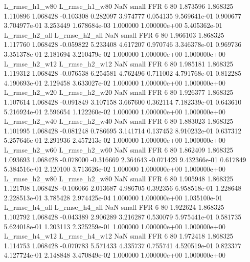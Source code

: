 L_rmse_h1_w80  L_rmse_h1_w80                   NaN      small      FFR                 6 80 1.873596       1.868325 1.110896       1.068428   -0.103308      0.282097      3.974777     0.054135   9.569641e-01  0.900677 3.704977e-01     3.253449   1.678684e-03            1.000000    1.000000e+00        5.405362e-01
 L_rmse_h2_all  L_rmse_h2_all                   NaN      small      FFR                 6 80 1.966103       1.868325 1.117760       1.068428   -0.059822      5.233408      4.617207     0.970746   3.346378e-01  0.969736 3.351378e-01     2.181694   3.210479e-02            1.000000    1.000000e+00        1.000000e+00
 L_rmse_h2_w12  L_rmse_h2_w12                   NaN      small      FFR                 6 80 1.985181       1.868325 1.119312       1.068428   -0.076538      6.254581      4.762496     0.711002   4.791768e-01  0.812285 4.190693e-01     2.129458   3.633027e-02            1.000000    1.000000e+00        1.000000e+00
 L_rmse_h2_w20  L_rmse_h2_w20                   NaN      small      FFR                 6 80 1.926377       1.868325 1.107614       1.068428   -0.091849      3.107158      3.667600     0.362114   7.182339e-01  0.643610 5.216924e-01     2.596654   1.122260e-02            1.000000    1.000000e+00        1.000000e+00
 L_rmse_h2_w40  L_rmse_h2_w40                   NaN      small      FFR                 6 80 1.883023       1.868325 1.101995       1.068428   -0.081248      0.786695      3.141714     0.137452   8.910232e-01  0.637312 5.257646e-01     2.291936   2.457213e-02            1.000000    1.000000e+00        1.000000e+00
 L_rmse_h2_w60  L_rmse_h2_w60                   NaN      small      FFR                 6 80 1.862409       1.868325 1.093693       1.068428   -0.078000     -0.316669      2.364643    -0.071429   9.432366e-01  0.617849 5.384516e-01     2.120100   3.713626e-02            1.000000    1.000000e+00        1.000000e+00
 L_rmse_h2_w80  L_rmse_h2_w80                   NaN      small      FFR                 6 80 1.905948       1.868325 1.121708       1.068428   -0.106066      2.013687      4.986705     0.392356   6.958518e-01  1.228648 2.228513e-01     3.785428   2.974425e-04            1.000000    1.000000e+00        1.035100e-01
 L_rmse_h4_all  L_rmse_h4_all                   NaN      small      FFR                 6 80 1.922624       1.868325 1.102792       1.068428   -0.043389      2.906289      3.216287     0.530079   5.975441e-01  0.581735 5.624018e-01     1.203113   2.325259e-01            1.000000    1.000000e+00        1.000000e+00
 L_rmse_h4_w12  L_rmse_h4_w12                   NaN      small      FFR                 6 80 1.972418       1.868325 1.114753       1.068428   -0.070783      5.571433      4.335737     0.755741   4.520519e-01  0.823377 4.127724e-01     2.148848   3.470849e-02            1.000000    1.000000e+00        1.000000e+00
